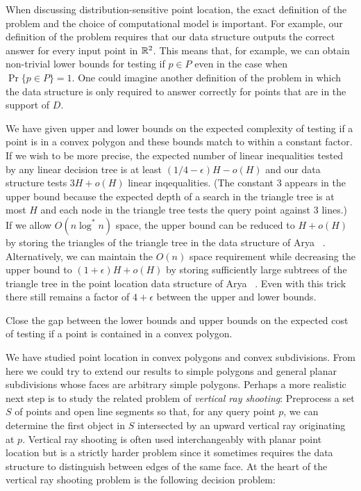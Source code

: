 \documentclass[charterfonts,lotsofwhite]{patmorin}
\begin{document}
When discussing distribution-sensitive point location, the exact
definition of the problem and the choice of computational model is
important.  For example, our definition of the problem requires that
our data structure outputs the correct answer for every input point in
$\mathbb{R}^2$.  This means that, for example, we can obtain non-trivial lower
bounds for testing if $p\in P$ even in the case when $\Pr\{p\in
P\}=1$. One could imagine another definition of the problem in which
the data structure is only required to answer correctly for points
that are in the support of $D$.

We have given upper and lower bounds on the expected complexity of
testing if a point is in a convex polygon and these bounds match to
within a constant factor.  If we wish to be more precise, the expected
number of linear inequalities tested by any linear decision tree is at
least $(1/4-\epsilon)H-o(H)$ and our data structure tests $3H+o(H)$
linear inqequalities. (The constant 3 appears in the upper bound
because the expected depth of a search in the triangle tree is at most
$H$ and each node in the triangle tree tests the query point against 3
lines.) If we allow $O(n\log^* n)$ space, the upper bound can be
reduced to $H+o(H)$  by storing the triangles of the triangle tree in
the data structure of Arya \etal\ \cite{amm01a}.  Alternatively, we
can maintain the $O(n)$ space requirement while decreasing the upper
bound to $(1+\epsilon)H+o(H)$ by storing sufficiently large subtrees
of the triangle tree in the point location data structure of Arya
\etal\ \cite{amm00,amm01a}.  Even with this trick there still remains
a factor of $4+\epsilon$ between the upper and lower bounds.

\begin{op}
Close the gap between the lower bounds and upper bounds on the
expected cost of testing if a point is contained in a convex polygon.
\end{op}

We have studied point location in convex polygons and convex
subdivisions.  From here we could try to extend our results to simple
polygons and general planar subdivisions whose faces are arbitrary
simple polygons. Perhaps a more realistic next step is to study the
related problem of \emph{vertical ray shooting}:  Preprocess a set $S$
of points and open line segments so that, for any query point $p$, we
can determine the first object in $S$ intersected by an upward
vertical ray originating at $p$.  Vertical ray shooting is often used
interchangeably with planar point location but is a strictly harder
problem since it sometimes requires the data structure to distinguish
between edges of the same face.  At the heart of the vertical ray
shooting problem is the following decision problem:
\end{document}
